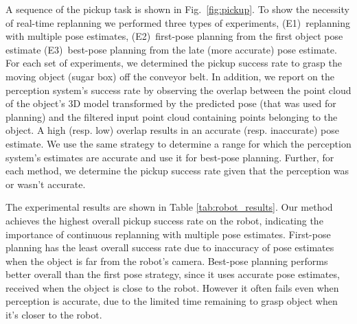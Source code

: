 \documentclass[a4paper]{report}
\begin{document}
A sequence of the pickup task is shown in Fig.~\ref{fig:pickup}. To show the necessity of real-time replanning we performed three types of experiments, 
(E1)~replanning with multiple pose estimates, 
(E2)~first-pose planning from the first object pose estimate 
(E3)~best-pose planning from the late (more accurate) pose estimate. 
%
For each set of experiments, we determined the pickup success rate to grasp the moving object (sugar box) off the conveyor belt. In addition, we report on the perception system's success rate by observing the overlap between the point cloud of the object's 3D model transformed by the predicted pose (that was used for planning) and the filtered input point cloud containing points belonging to the object. 
A high (resp. low) overlap results in an accurate (resp. inaccurate) pose estimate. 
%
We use the same strategy to determine a range for which the perception system's estimates are accurate and use it for best-pose planning. 
Further, for each method, we determine the pickup success rate given that the perception was or wasn't accurate. 

The experimental results are shown in Table \ref{tab:robot_results}. Our method achieves the highest overall pickup success rate on the robot, indicating the importance of continuous replanning with multiple pose estimates. 
First-pose planning has the least overall success rate due to inaccuracy of pose estimates when the object is far from the robot's camera. 
Best-pose planning performs better overall than the first pose strategy, since it uses accurate pose estimates, received when the object is close to the robot. However it often fails even when perception is accurate, due to the limited time remaining to grasp object when it's closer to the robot. 
\end{document}
